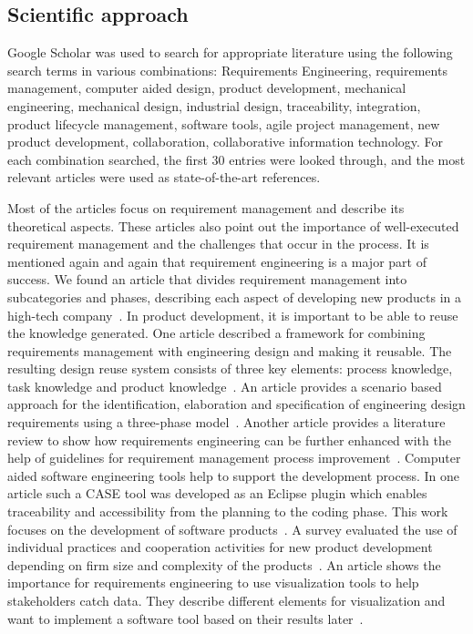     \subsection*{Scientific approach}
    Google Scholar was used to search for appropriate literature using the following search terms in various combinations: Requirements Engineering, requirements management, computer aided design, product development, mechanical engineering, mechanical design, industrial design, traceability, integration, product lifecycle management, software tools, agile project management, new product development, collaboration, collaborative information technology. For each combination searched, the first 30 entries were looked through, and the most relevant articles were used as state-of-the-art references. 
    
    Most of the articles focus on requirement management and describe its theoretical aspects. These articles also point out the importance of well-executed requirement management and the challenges that occur in the process. It is mentioned again and again that requirement engineering is a major part of success.
    We found an article that divides requirement management into subcategories and phases, describing each aspect of developing new products in a high-tech company~\cite{Ahti2005}.
    In product development, it is important to be able to reuse the knowledge generated. One article described a framework for combining requirements management with engineering design and making it reusable. The resulting design reuse system consists of three key elements: process knowledge, task knowledge and product knowledge~\cite{BAXTER2008585}.
    An article provides a scenario based approach for the identification, elaboration and specification of engineering design requirements using a three-phase model~\cite{liu2012scenario}.
    Another article provides a literature review to show how requirements engineering can be further enhanced with the help of guidelines for requirement management process improvement~\cite{Kauppinen2005}.
    Computer aided software engineering tools help to support the development process. In one article such a CASE tool was developed as an Eclipse plugin which enables traceability and accessibility from the planning to the coding phase. This work focuses on the development of software products~\cite{6976693}.
    A survey evaluated the use of individual practices and cooperation activities for new product development depending on firm size and complexity of the products~\cite{sanchez2003flexibility}.
    An article shows the importance for requirements engineering to use visualization tools to help stakeholders catch data. They describe different elements for visualization and want to implement a software tool based on their results later~\cite{RICHTER2020271}.
